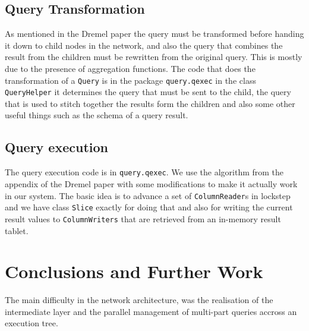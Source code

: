 \subsection{Query Transformation}
As mentioned in the Dremel paper \cite{melnik2010dremel} the query must
be transformed before handing it down to child nodes in the network,
and also the query that combines the result from the children must be
rewritten from the original query. This is mostly due to the presence
of aggregation functions. The code that does the transformation of a
\texttt{Query} is in the package \texttt{query.qexec} in the class
\texttt{QueryHelper} it determines the query that must be sent to the child,
the query that is used to stitch together the results form the children
and also some other useful things such as the schema of a query result.

\subsection{Query execution}
The query execution code is in \texttt{query.qexec}. We use the algorithm
from the appendix of the Dremel paper with some modifications to make it
actually work in our system. The basic idea is to advance a set of
\texttt{ColumnReader}s in lockstep and we have class \texttt{Slice} exactly
for doing that and also for writing the current result values to
\texttt{ColumnWriters} that are retrieved from an in-memory result tablet.


\section{Conclusions and Further Work}
  The main difficulty in the network architecture, was the realisation of
  the intermediate layer and the parallel management of multi-part queries
  accross an execution tree.

